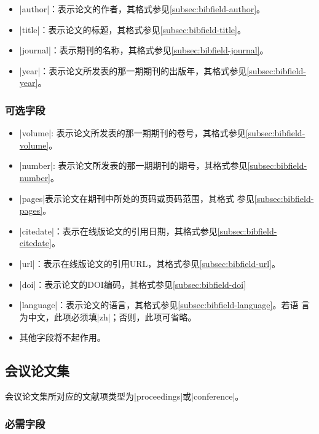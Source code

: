 \begin{itemize}
\item |author|：表示论文的作者，其格式参见\ref{subsec:bibfield-author}。
\item |title|：表示论文的标题，其格式参见\ref{subsec:bibfield-title}。
\item |journal|：表示期刊的名称，其格式参见\ref{subsec:bibfield-journal}。
\item |year|：表示论文所发表的那一期期刊的出版年，其格式参见\ref{subsec:bibfield-year}。
\end{itemize}

\subsubsection{可选字段}

\begin{itemize}
\item |volume|: 表示论文所发表的那一期期刊的卷号，其格式参见\ref{subsec:bibfield-volume}。
\item |number|: 表示论文所发表的那一期期刊的期号，其格式参见\ref{subsec:bibfield-number}。
\item |pages|表示论文在期刊中所处的页码或页码范围，其格式
  参见\ref{subsec:bibfield-pages}。
\item |citedate|：表示在线版论文的引用日期，其格式参见\ref{subsec:bibfield-citedate}。
\item |url|：表示在线版论文的引用URL，其格式参见\ref{subsec:bibfield-url}。
\item |doi|：表示论文的DOI编码，其格式参见\ref{subsec:bibfield-doi}
\item |language|：表示论文的语言，其格式参见\ref{subsec:bibfield-language}。若语
  言为中文，此项必须填|zh|；否则，此项可省略。
\item 其他字段将不起作用。
\end{itemize}

\subsection{会议论文集}\label{subsec:bibtype-proceedings}

会议论文集所对应的{\BibTeX}文献项类型为|proceedings|或|conference|。

\subsubsection{必需字段}

